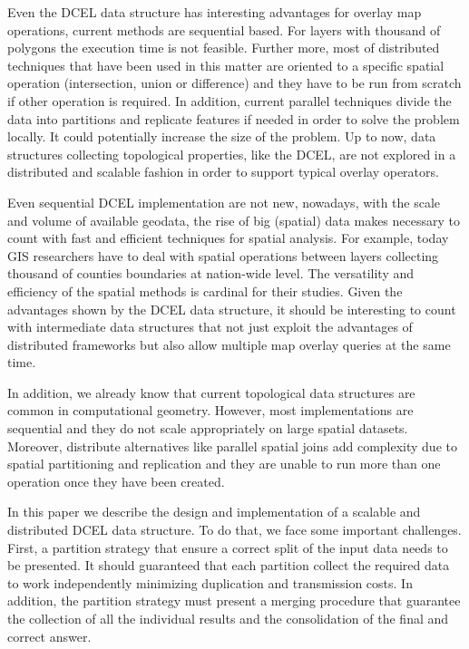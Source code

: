 Even the DCEL data structure has interesting advantages for overlay map operations, current methods are sequential based.  For layers with thousand of polygons the execution time is not feasible.  Further more, most of distributed techniques that have been used in this matter are oriented to a specific spatial operation (intersection, union or difference) and they have to be run from scratch if other operation is required.  In addition, current parallel techniques divide the data into partitions and replicate features if needed in order to solve the problem locally.  It could potentially increase the size of the problem.  Up to now, data structures collecting topological properties, like the DCEL, are not explored in a distributed and scalable fashion in order to support typical overlay operators.

Even sequential DCEL implementation are not new, nowadays, with the scale and volume of available geodata, the rise of big (spatial) data makes necessary to count with fast and efficient techniques for spatial analysis.  For example, today GIS researchers have to deal with spatial operations between layers collecting thousand of counties boundaries at nation-wide level.  The versatility and efficiency of the spatial methods is cardinal for their studies. Given the advantages shown by the DCEL data structure, it should be interesting to count with intermediate data structures that not just exploit the advantages of distributed frameworks but also allow multiple map overlay queries at the same time. 

In addition, we already know that current topological data structures are common in computational geometry.  However, most implementations are sequential and they do not scale appropriately on large spatial datasets.  Moreover, distribute alternatives like parallel spatial joins add complexity due to spatial partitioning and replication and they are unable to run more than one operation once they have been created.

In this paper we describe the design and implementation of a scalable and distributed DCEL data structure.  To do that, we face some important challenges.  First, a partition strategy that ensure a correct split of the input data needs to be presented.  It should guaranteed that each partition collect the required data to work independently minimizing duplication and transmission costs.  In addition, the partition strategy must present a merging procedure that guarantee the collection of all the individual results and the consolidation of the final and correct answer.

